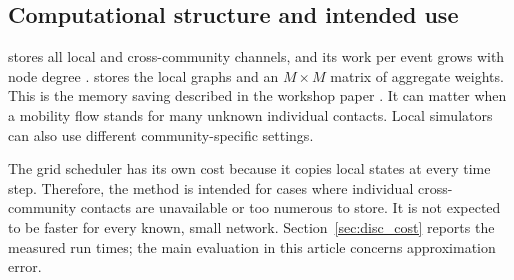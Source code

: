 \subsection{Computational structure and intended use}
\label{sec:cost}

\Full{} stores all local and cross-community channels, and its work per event grows with node degree \citep{kuryliak2025simulating}. \TS{} stores the local graphs and an $M\times M$ matrix of aggregate weights. This is the memory saving described in the workshop paper \citep{kuryliak2025towards}. It can matter when a mobility flow stands for many unknown individual contacts. Local simulators can also use different community-specific settings.

The grid scheduler has its own cost because it copies local states at every time step. Therefore, the method is intended for cases where individual cross-community contacts are unavailable or too numerous to store. It is not expected to be faster for every known, small network. Section~\ref{sec:disc_cost} reports the measured run times; the main evaluation in this article concerns approximation error.

\clearpage
\endgroup
